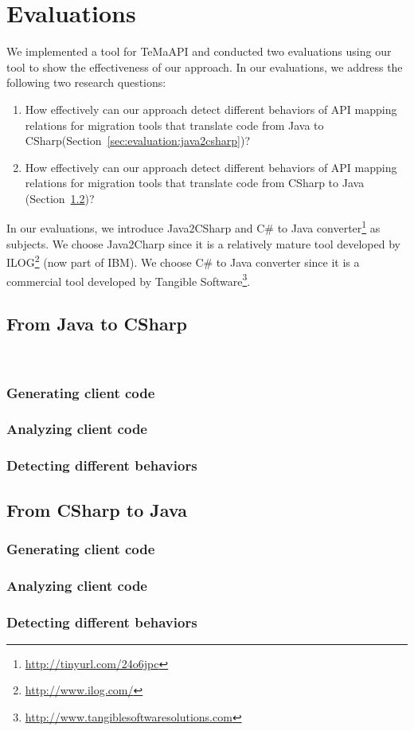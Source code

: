 \section{Evaluations}
\label{sec:evaluation}

We implemented a tool for TeMaAPI and
conducted two evaluations using our tool to show the effectiveness
of our approach. In our evaluations, we address the following
two research questions:

\begin{enumerate}
\item How effectively can our approach detect different behaviors of API mapping relations for migration tools that translate code from Java to CSharp(Section~\ref{sec:evaluation:java2csharp})? \vspace*{-1.8ex}
\item How effectively can our approach detect different behaviors of API mapping relations for migration tools that translate code from CSharp to Java (Section~\ref{sec:evaluation:csharp2java})? %
\end{enumerate}%

In our evaluations, we introduce Java2CSharp and C\# to Java converter\footnote{\url{http://tinyurl.com/24o6jpc}} as subjects. We choose Java2Charp since it is a relatively mature tool developed by ILOG\footnote{\url{http://www.ilog.com/}} (now part of IBM). We choose C\# to Java converter since it is a commercial tool developed by Tangible Software\footnote{\url{http://www.tangiblesoftwaresolutions.com}}.
\subsection{From Java to CSharp}\
\label{sec:evaluation:java2csharp}
\subsubsection{Generating client code}
\subsubsection{Analyzing client code}
\subsubsection{Detecting different behaviors}
\subsection{From CSharp to Java}
\label{sec:evaluation:csharp2java}
\subsubsection{Generating client code}
\subsubsection{Analyzing client code}
\subsubsection{Detecting different behaviors}
